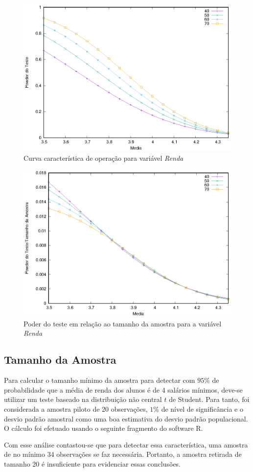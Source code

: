 	\begin{figure}
		\centering
		\includegraphics[width=0.8\linewidth]{questao2/powers.eps}
		\caption{Curva característica de operação para variável \textit{Renda}}
		\label{figure: poder do teste renda}
	\end{figure}

	\begin{figure}
		\centering
		\includegraphics[width=0.8\linewidth]{questao2/powers-breakdown.eps}
		\caption{Poder do teste em relação ao tamanho da amostra para a variável \textit{Renda}}
		\label{figure: poder do teste e tamanho da amostra renda}
	\end{figure}

\subsection{Tamanho da Amostra}

	Para calcular o tamanho mínimo da amostra para detectar com $95\%$ de
	probabilidade que a média de renda dos alunos é de 4 salários mínimos,
	deve-se utilizar um teste baseado na distribuição não central $t$ de Student.
	Para tanto, foi considerada a amostra piloto de 20 observações, $1\%$ de
	nível de significância e o desvio padrão amostral como uma boa estimativa do
	desvio padrão populacional. O cálculo foi efetuado usando o seguinte
	fragmento do software R.

	Com esse análise contastou-se que para detectar essa característica, uma
	amostra de no mínimo 34 observações se faz necessária. Portanto, a amostra
	retirada de tamanho 20 é insuficiente para evidenciar essas conclusões.

